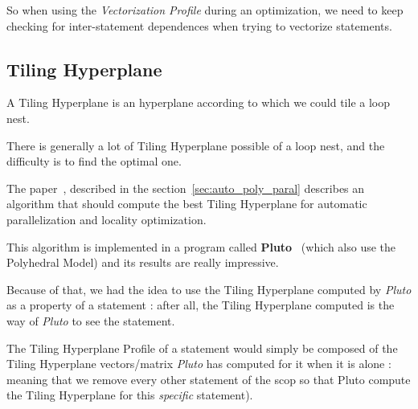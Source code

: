 \documentclass[paper=a4, fontsize=11pt]{scrartcl}
\numberwithin{equation}{section}        %
\numberwithin{figure}{section}          %
\numberwithin{table}{section}               %
\begin{document}
    So when using the \textit{Vectorization Profile} during an optimization, we need to keep
    checking for inter-statement dependences when trying to vectorize statements.


    \subsection{Tiling Hyperplane}
        A Tiling Hyperplane is an hyperplane according to which we could tile a loop nest.
        
        There is generally a lot of Tiling Hyperplane possible of a loop nest, and the difficulty
        is to find the optimal one.

        The paper~\cite{Bondhugula:2008:PAP:1379022.1375595}, described in the section~\ref{sec:auto_poly_paral}
        describes an algorithm that should compute the best Tiling Hyperplane for automatic
        parallelization and locality optimization.

        This algorithm is implemented in a program called \textbf{Pluto}~\cite{pluto} (which also
        use the Polyhedral Model) and its results are really impressive.

        Because of that, we had the idea to use the Tiling Hyperplane computed by \textit{Pluto}
        as a property of a statement : after all, the Tiling Hyperplane computed is the way
        of \textit{Pluto} to see the statement.

        The Tiling Hyperplane Profile of a statement would simply be composed
        of the Tiling Hyperplane vectors/matrix \textit{Pluto} has computed for
        it when it is alone : meaning that we remove every other
        statement of the scop so that Pluto compute the Tiling Hyperplane for this \textit{specific}
        statement).


\end{document}
